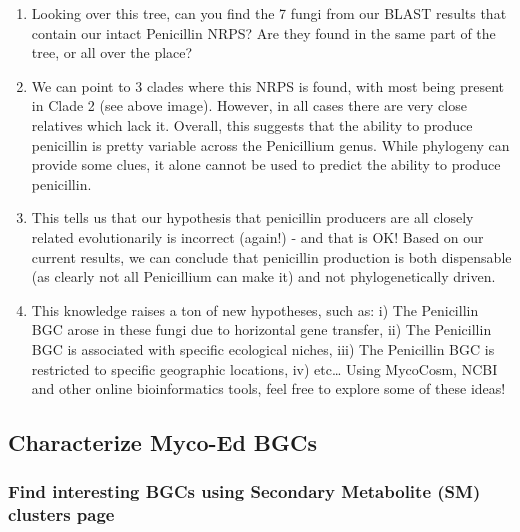 \documentclass[
  letterpaper,
  DIV=11,
  numbers=noendperiod]{scrreprt}
\begin{document}
\begin{enumerate}
  You will see that the tree compresses and highlights the lineages that
  match your search, in this case, strains of P. chrysogenum. Everything
  else will be grayed out. Click `Expand All' and you can see where they
  are in the larger Penicillium tree. Click the clear to restore
  everything to default colors.
\item
  Looking over this tree, can you find the 7 fungi from our BLAST
  results that contain our intact Penicillin NRPS? Are they found in the
  same part of the tree, or all over the place?
\item
  We can point to 3 clades where this NRPS is found, with most being
  present in Clade 2 (see above image). However, in all cases there are
  very close relatives which lack it. Overall, this suggests that the
  ability to produce penicillin is pretty variable across the
  Penicillium genus. While phylogeny can provide some clues, it alone
  cannot be used to predict the ability to produce penicillin.
\item
  This tells us that our hypothesis that penicillin producers are all
  closely related evolutionarily is incorrect (again!) - and that is OK!
  Based on our current results, we can conclude that penicillin
  production is both dispensable (as clearly not all Penicillium can
  make it) and not phylogenetically driven.
\item
  This knowledge raises a ton of new hypotheses, such as: i) The
  Penicillin BGC arose in these fungi due to horizontal gene transfer,
  ii) The Penicillin BGC is associated with specific ecological niches,
  iii) The Penicillin BGC is restricted to specific geographic
  locations, iv) etc\ldots{} Using MycoCosm, NCBI and other online
  bioinformatics tools, feel free to explore some of these ideas!
\end{enumerate}

\subsection*{Characterize Myco-Ed BGCs}\label{characterize-myco-ed-bgcs}

\subsubsection*{Find interesting BGCs using Secondary Metabolite (SM)
clusters
page}\label{find-interesting-bgcs-using-secondary-metabolite-sm-clusters-page}
\end{document}
